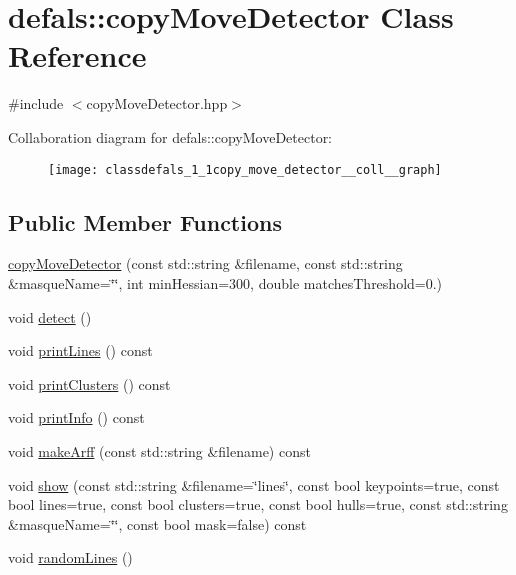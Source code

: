 \hypertarget{classdefals_1_1copy_move_detector}{}\section{defals\+:\+:copy\+Move\+Detector Class Reference}
\label{classdefals_1_1copy_move_detector}


{\ttfamily \#include $<$copy\+Move\+Detector.\+hpp$>$}



Collaboration diagram for defals\+:\+:copy\+Move\+Detector\+:\nopagebreak
\begin{figure}[H]
\begin{center}
\leavevmode
\texttt{[image: classdefals\_1\_1copy\_move\_detector\_\_coll\_\_graph]}
\end{center}
\end{figure}
\subsection*{Public Member Functions}
\begin{DoxyCompactItemize}
\item 
\hyperlink{classdefals_1_1copy_move_detector_acf2eb1bc6f3e65f3f638478441a58c8a}{copy\+Move\+Detector} (const std\+::string \&filename, const std\+::string \&masque\+Name=\char`\"{}\char`\"{}, int min\+Hessian=300, double matches\+Threshold=0.)
\item 
void \hyperlink{classdefals_1_1copy_move_detector_a97cd7553e415ef2cc85c9b8f1110d05b}{detect} ()
\item 
void \hyperlink{classdefals_1_1copy_move_detector_a1dda27b106215ae248c5083536a2c001}{print\+Lines} () const
\item 
void \hyperlink{classdefals_1_1copy_move_detector_a397e6715d0a274c67ed81735da36329f}{print\+Clusters} () const
\item 
void \hyperlink{classdefals_1_1copy_move_detector_a9fd2ba369ce7ab6fb7f5a7b9c23f4eae}{print\+Info} () const
\item 
void \hyperlink{classdefals_1_1copy_move_detector_aba417dff2b877dacc4481b5bfd3786ed}{make\+Arff} (const std\+::string \&filename) const
\item 
void \hyperlink{classdefals_1_1copy_move_detector_a5e773c10c8cbec7abb70ecf54422c19a}{show} (const std\+::string \&filename=\char`\"{}lines\char`\"{}, const bool keypoints=true, const bool lines=true, const bool clusters=true, const bool hulls=true, const std\+::string \&masque\+Name=\char`\"{}\char`\"{}, const bool mask=false) const
\item 
void \hyperlink{classdefals_1_1copy_move_detector_aa5905be2d93768f3baddd750204e362c}{random\+Lines} ()
\end{DoxyCompactItemize}

